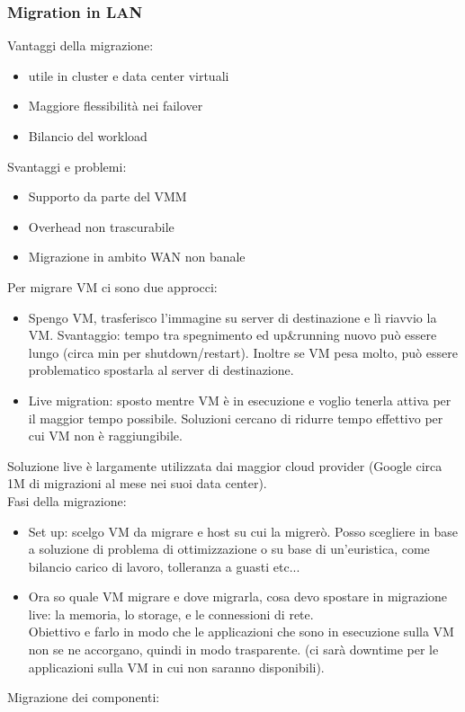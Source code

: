 \documentclass{article}
\begin{document}
\subsubsection{Migration in LAN}
Vantaggi della migrazione:
\begin{itemize}
\item utile in cluster e data center virtuali
\item Maggiore flessibilità nei failover
\item Bilancio del workload
\end{itemize}
Svantaggi e problemi:
\begin{itemize}
\item Supporto da parte del VMM
\item Overhead non trascurabile
\item Migrazione in ambito WAN non banale
\end{itemize}
Per migrare VM ci sono due approcci:
\begin{itemize}
\item Spengo VM, trasferisco l'immagine su server di destinazione e lì riavvio la VM. Svantaggio: tempo tra spegnimento ed up\&running nuovo può essere lungo (circa min per shutdown/restart). Inoltre se VM pesa molto, può essere problematico spostarla al server di destinazione.
\item Live migration: sposto mentre VM è in esecuzione e voglio tenerla attiva per il maggior tempo possibile. Soluzioni cercano di ridurre tempo effettivo per cui VM non è raggiungibile.
\end{itemize}
Soluzione live è largamente utilizzata dai maggior cloud provider (Google circa 1M di migrazioni al mese nei suoi data center).\\ Fasi della migrazione:
\begin{itemize}
\item Set up: scelgo VM da migrare e host su cui la migrerò. Posso scegliere in base a soluzione di problema di ottimizzazione o su base di un'euristica, come bilancio carico di lavoro, tolleranza a guasti etc...
\item Ora so quale VM migrare e dove migrarla, cosa devo spostare in migrazione live: la memoria, lo storage, e le connessioni di rete.\\ Obiettivo e farlo in modo che le applicazioni che sono in esecuzione sulla VM non se ne accorgano, quindi in modo trasparente. (ci sarà downtime per le applicazioni sulla VM in cui non saranno disponibili).
\end{itemize}
Migrazione dei componenti:
\end{document}
